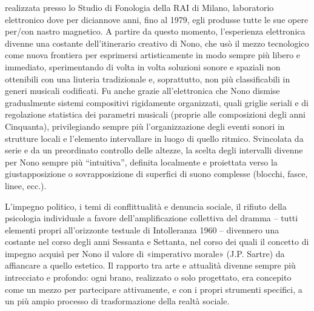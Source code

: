 realizzata presso lo Studio di Fonologia della RAI di Milano, laboratorio elettronico dove per diciannove anni, fino al 1979, egli produsse tutte le sue opere per/con nastro magnetico. A partire da questo momento, l’esperienza elettronica divenne una costante dell’itinerario creativo di Nono, che usò il mezzo tecnologico come nuova frontiera per esprimersi artisticamente in modo sempre più libero e immediato, sperimentando di volta in volta soluzioni sonore e spaziali non ottenibili con una liuteria tradizionale e, soprattutto, non più classificabili in generi musicali codificati. Fu anche grazie all’elettronica che Nono dismise gradualmente sistemi compositivi rigidamente organizzati, quali griglie seriali e di regolazione statistica dei parametri musicali (proprie alle composizioni degli anni Cinquanta), privilegiando sempre più l’organizzazione degli eventi sonori in strutture locali e l’elemento intervallare in luogo di quello ritmico. Svincolata da serie e da un preordinato controllo delle altezze, la scelta degli intervalli divenne per Nono sempre più “intuitiva”, definita localmente e proiettata verso la giustapposizione o sovrapposizione di superfici di suono complesse (blocchi, fasce, linee, ecc.).

L’impegno politico, i temi di conflittualità e denuncia sociale, il rifiuto della psicologia individuale a favore dell’amplificazione collettiva del dramma – tutti elementi propri all’orizzonte testuale di Intolleranza 1960 – divennero una costante nel corso degli anni Sessanta e Settanta, nel corso dei quali il concetto di impegno acquisì per Nono il valore di «imperativo morale» (J.P. Sartre) da affiancare a quello estetico. Il rapporto tra arte e attualità divenne sempre più intrecciato e profondo: ogni brano, realizzato o solo progettato, era concepito come un mezzo per partecipare attivamente, e con i propri strumenti specifici, a un più ampio processo di trasformazione della realtà sociale.

